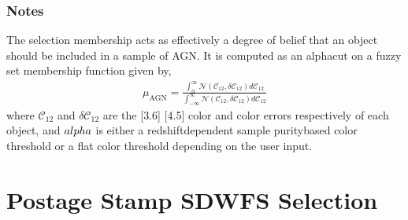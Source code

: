 \documentclass[letterpaper,12pt,english]{sphinxmanual}
\begin{document}
\begin{fulllineitems}
\begin{fulllineitems}
\subsubsection*{Notes}

\sphinxAtStartPar
The selection membership acts as effectively a degree of belief that an object should be included in a sample of
AGN. It is computed as an alpha\sphinxhyphen{}cut on a fuzzy set membership function given by,
\begin{equation*}
\begin{split}\mu_{\mathrm{AGN}} =
    \frac{\int_{\alpha}^{\infty} \mathcal{N}(\mathcal{C}_{12},\delta\mathcal{C}_{12}) d\mathcal{C}_{12}}
    {\int_{-\infty}^{\infty} \mathcal{N}(\mathcal{C}_{12}, \delta\mathcal{C}_{12}) d\mathcal{C}_{12}}\end{split}
\end{equation*}
\sphinxAtStartPar
where \(\mathcal{C}_{12}\) and \(\delta\mathcal{C}_{12}\) are the {[}3.6{]} \sphinxhyphen{} {[}4.5{]} color and color
errors respectively of each object, and \(\\alpha\) is either a redshift\sphinxhyphen{}dependent sample purity\sphinxhyphen{}based color
threshold or a flat color threshold depending on the user input.

\end{fulllineitems}


\end{fulllineitems}



\section{Postage Stamp SDWFS Selection}
\label{\detokenize{api/selector:postage-stamp-sdwfs-selection}}
\end{document}
